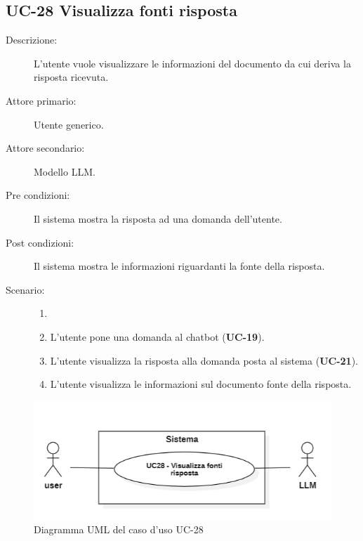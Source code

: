 \subsection{UC-28 Visualizza fonti risposta}
\begin{description}
    \item[Descrizione:] L'utente vuole visualizzare le informazioni del documento da cui deriva la risposta ricevuta.
    \item[Attore primario:] Utente generico.
    \item[Attore secondario:] Modello LLM.
    \item[Pre condizioni:] Il sistema mostra la risposta ad una domanda dell'utente.
    \item[Post condizioni:] Il sistema mostra le informazioni riguardanti la fonte della risposta.
    \item[Scenario:]
    \begin{enumerate}
        \item[]
        \item L’utente pone una domanda al chatbot (\textbf{UC-19}).
        \item L'utente visualizza la risposta alla domanda posta al sistema (\textbf{UC-21}).
        \item L'utente visualizza le informazioni sul documento fonte della risposta.
    \end{enumerate}
\end{description}

\begin{figure}[H]
    \centering
    \includegraphics[width=0.9\linewidth]{UC28.PNG}
    \caption{Diagramma UML del caso d'uso UC-28}
    \label{fig:UC32}
\end{figure}

